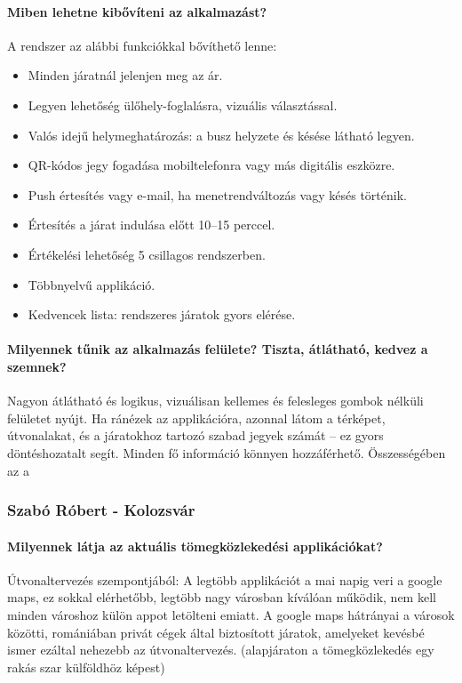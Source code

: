 \paragraph*{Miben lehetne kibővíteni az alkalmazást?}

A rendszer az alábbi funkciókkal bővíthető lenne:
\begin{itemize}
    \item Minden járatnál jelenjen meg az ár.
    \item Legyen lehetőség ülőhely-foglalásra, vizuális választással.
    \item Valós idejű helymeghatározás: a busz helyzete és késése látható legyen.
    \item QR-kódos jegy fogadása mobiltelefonra vagy más digitális eszközre.
    \item Push értesítés vagy e-mail, ha menetrendváltozás vagy késés történik.
    \item Értesítés a járat indulása előtt 10–15 perccel.
    \item Értékelési lehetőség 5 csillagos rendszerben.
    \item Többnyelvű applikáció.
    \item Kedvencek lista: rendszeres járatok gyors elérése.
\end{itemize}

\paragraph*{Milyennek tűnik az alkalmazás felülete? Tiszta, átlátható, kedvez a szemnek?}
Nagyon átlátható és logikus, vizuálisan kellemes és felesleges gombok nélküli felületet nyújt. Ha ránézek az applikációra, azonnal látom a térképet, útvonalakat, és a járatokhoz tartozó szabad jegyek számát – ez gyors döntéshozatalt segít. Minden fő információ könnyen hozzáférhető. Összességében az a

\subsubsection{Szabó Róbert - Kolozsvár}

\paragraph*{Milyennek látja az aktuális tömegközlekedési applikációkat?}
Útvonaltervezés szempontjából:
A legtöbb applikációt a mai napig veri a google maps, ez sokkal elérhetőbb, legtöbb nagy városban kíválóan működik, nem kell minden városhoz külön appot letölteni emiatt.
A google maps hátrányai a városok közötti, romániában privát cégek által biztosított járatok, amelyeket kevésbé ismer ezáltal nehezebb az útvonaltervezés. (alapjáraton a tömegközlekedés egy rakás szar külföldhöz képest)

